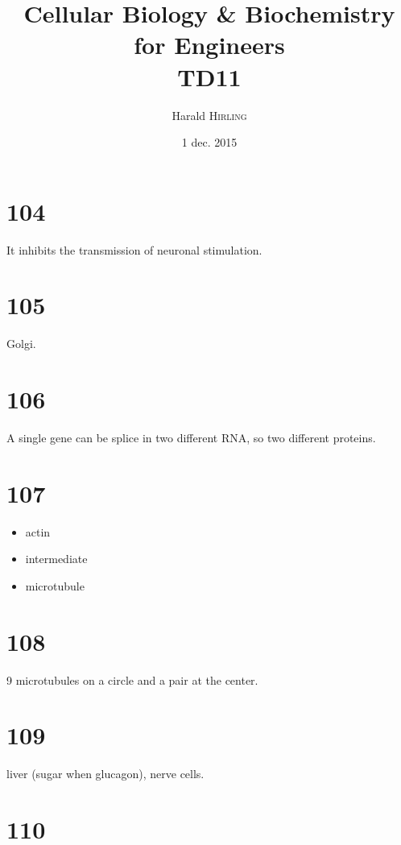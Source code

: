 

\title{Cellular Biology \& Biochemistry for Engineers\\TD11}
\author{Harald \textsc{Hirling}}
\date{1 dec. 2015}


\maketitle

\section*{104}

It inhibits the transmission of neuronal stimulation.

\section*{105}

Golgi.

\section*{106}

A single gene can be splice in two different RNA, so two different proteins.

\section*{107}

\begin{itemize}
    \item actin
    \item intermediate
    \item microtubule
\end{itemize}

\section*{108}

9 microtubules on a circle and a pair at the center.

\section*{109}

liver (sugar when glucagon), nerve cells.

\section*{110}

